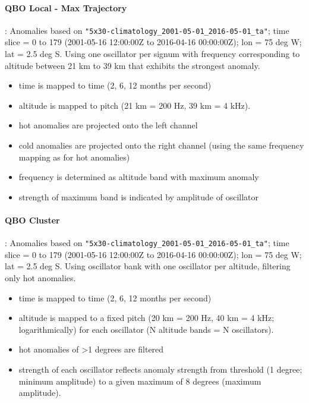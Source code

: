 \documentclass[11pt,a4paper]{article}
\begin{document}
\paragraph{QBO Local - Max Trajectory}:
Anomalies based on \Verb!"5x30-climatology_2001-05-01_2016-05-01_ta"!; time slice = 0 to 179 (2001-05-16 12:00:00Z to 2016-04-16 00:00:00Z); lon = 75 deg W; lat = 2.5 deg S. Using one oscillator per signum with frequency corresponding to altitude between 21 km to 39 km that exhibits the strongest anomaly.
%
\begin{itemize}
\item time is mapped to time (2, 6, 12 months per second)
\item altitude is mapped to pitch (21 km = 200 Hz, 39 km = 4 kHz).
\item hot anomalies are projected onto the left channel
\item cold anomalies are projected onto the right channel (using the same frequency mapping as for hot anomalies)
\item frequency is determined as altitude band with maximum anomaly
\item strength of maximum band is indicated by amplitude of oscillator
\end{itemize}

\paragraph{QBO Cluster}:
Anomalies based on \Verb!"5x30-climatology_2001-05-01_2016-05-01_ta"!; time slice = 0 to 179 (2001-05-16 12:00:00Z to 2016-04-16 00:00:00Z); lon = 75 deg W; lat = 2.5 deg S. Using oscillator bank with one oscillator per altitude, filtering only hot anomalies.
%
\begin{itemize}
\item time is mapped to time (2, 6, 12 months per second)
\item altitude is mapped to a fixed pitch (20 km = 200 Hz, 40 km = 4 kHz; logarithmically) for each oscillator (N altitude bands = N oscillators).
\item hot anomalies of >1 degrees are filtered
\item strength of each oscillator reflects anomaly strength from threshold
(1 degree; minimum amplitude) to a given maximum of 8 degrees (maximum amplitude).
\end{itemize}
\end{document}
